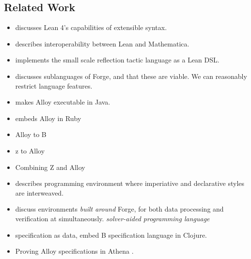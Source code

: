\subsection{Related Work}\label{sec:bg-related}
{\color{OliveGreen}
\begin{itemize}
    \item \cite{ullrich2022beyond} discusses Lean 4's capabilities of extensible syntax. 
    \item \cite{lewis2022bi} describes interoperability between Lean and Mathematica. 
    \item \cite{gladshtein2024small} implements the small scale reflection tactic language as a Lean DSL. 
    \item \cite{ngpdbccdlrrvwwk-oopsla-2024} discusses sublanguages of Forge, and that these are viable. We can reasonably restrict language features. 
    \item \cite{milicevic2010executable} makes Alloy executable in Java. 
    \item \cite{milicevic2014alpha} embeds Alloy in Ruby
    \item \cite{krings2018translation} Alloy to B 
    \item \cite{malik2010translating} z to Alloy
    \item \cite{mikhailov2002approach} Combining Z and Alloy
    \item \cite{milicevic2015advancing} describes programming environment where imperiative and declarative styles are interweaved. 
    \item \cite{st2023comparison} discuss environments \emph{built around} Forge, for both data processing and verification at simultaneously. \emph{solver-aided programming language}
    \item \cite{korner2022embedding} specification as data, embed B specification language in Clojure. 
    \item \cite{arkoudas2004integrating} Proving Alloy specifications in Athena \cite{arkoudas2000denotational,musser2003proving}.
\end{itemize}}
